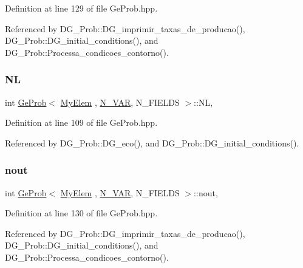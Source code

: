 Definition at line 129 of file Ge\+Prob.\+hpp.



Referenced by D\+G\+\_\+\+Prob\+::\+D\+G\+\_\+imprimir\+\_\+taxas\+\_\+de\+\_\+producao(), D\+G\+\_\+\+Prob\+::\+D\+G\+\_\+initial\+\_\+conditions(), and D\+G\+\_\+\+Prob\+::\+Processa\+\_\+condicoes\+\_\+contorno().

\mbox{\label{classGeProb_a4608e6b80b16c86a7bd7451adebc6f69}} 
\subsubsection{\texorpdfstring{NL}{NL}}
{\footnotesize\ttfamily int \hyperlink{classGeProb}{Ge\+Prob}$<$ \hyperlink{DG__Prob_8h_a83cd887ced9a6587428f267e50cd4787}{My\+Elem} , \hyperlink{classED__Prob_a4e7d2ff1a8e435e336fb00c527224b5a}{N\+\_\+\+V\+AR}, N\+\_\+\+F\+I\+E\+L\+DS $>$\+::NL\hspace{0.3cm}{\ttfamily [protected]}, {\ttfamily [inherited]}}



Definition at line 109 of file Ge\+Prob.\+hpp.



Referenced by D\+G\+\_\+\+Prob\+::\+D\+G\+\_\+eco(), and D\+G\+\_\+\+Prob\+::\+D\+G\+\_\+initial\+\_\+conditions().

\mbox{\label{classGeProb_ae6ee447645542bcb3addd78e9896f546}} 
\subsubsection{\texorpdfstring{nout}{nout}}
{\footnotesize\ttfamily int \hyperlink{classGeProb}{Ge\+Prob}$<$ \hyperlink{DG__Prob_8h_a83cd887ced9a6587428f267e50cd4787}{My\+Elem} , \hyperlink{classED__Prob_a4e7d2ff1a8e435e336fb00c527224b5a}{N\+\_\+\+V\+AR}, N\+\_\+\+F\+I\+E\+L\+DS $>$\+::nout\hspace{0.3cm}{\ttfamily [protected]}, {\ttfamily [inherited]}}



Definition at line 130 of file Ge\+Prob.\+hpp.



Referenced by D\+G\+\_\+\+Prob\+::\+D\+G\+\_\+imprimir\+\_\+taxas\+\_\+de\+\_\+producao(), D\+G\+\_\+\+Prob\+::\+D\+G\+\_\+initial\+\_\+conditions(), and D\+G\+\_\+\+Prob\+::\+Processa\+\_\+condicoes\+\_\+contorno().

